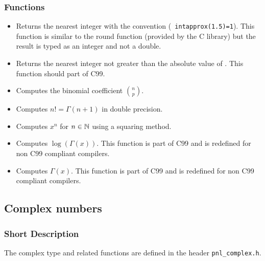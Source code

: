 \subsubsection{Functions}
\begin{itemize}
\item {}
  \sshortdescribe Returns the nearest integer with the convention ({\tt
    intapprox(1.5)=1}). This function is similar to the round function
  (provided by the C library) but the result is typed as an integer and not a
  double.

\item {}
  \sshortdescribe Returns the nearest integer not greater than the absolute
  value of . This function should part of C99.

\item {}
  \sshortdescribe Computes the binomial coefficient $\binom{n}{p}$.

\item {}
  \sshortdescribe Computes $n! = \Gamma(n+1)$ in double precision.

\item {}
  \sshortdescribe Computes $x^n$ for $n \in {\mathbb N}$ using a squaring method.

\item {}
  \sshortdescribe Computes $\log(\Gamma(x))$. This function is part of C99 and is
  redefined for non C99 compliant compilers.

\item {}
  \sshortdescribe Computes $\Gamma(x)$. This function is part of C99 and is
  redefined for non C99 compliant compilers.

\end{itemize}

\subsection{Complex numbers}
\subsubsection{Short Description}

The complex type and related functions are defined in the header
\verb!pnl_complex.h!.\\

